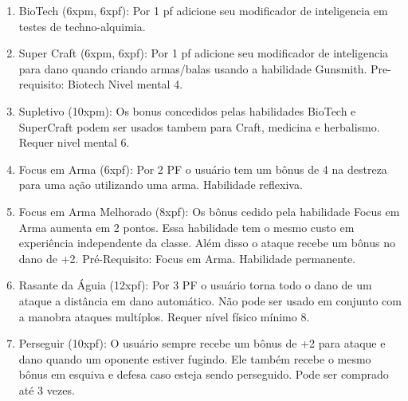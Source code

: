 \begin{enumerate}

	
	\item BioTech (6xpm, 6xpf): Por 1 pf adicione seu modificador de inteligencia em testes de techno-alquimia.

	\item Super Craft (6xpm, 6xpf): Por 1 pf adicione seu modificador de inteligencia para dano quando criando armas/balas usando a habilidade Gunsmith. Pre-requisito: Biotech Nivel mental 4.
	
	\item Supletivo (10xpm): Os bonus concedidos pelas habilidades BioTech e SuperCraft podem ser usados tambem para Craft, medicina e herbalismo. Requer nivel mental 6.
	
	\item Focus em Arma (6xpf): Por 2 PF o usuário tem um bônus de 4 na destreza para uma ação utilizando uma arma. Habilidade reflexiva.

	\item Focus em Arma Melhorado (8xpf): Os bônus cedido pela habilidade Focus em Arma aumenta em 2 pontos. Essa habilidade tem o mesmo custo em experiência independente da classe. Além disso o ataque recebe um bônus no dano de +2. Pré-Requisito: Focus em Arma. Habilidade permanente.


	\item Rasante da Águia (12xpf): Por 3 PF o usuário torna todo o dano de um ataque a distância em dano automático. Não pode ser usado em conjunto com a manobra ataques multíplos. Requer nível físico mínimo 8. 

	\item Perseguir (10xpf): O usuário sempre recebe um bônus de +2 para ataque e dano quando um oponente estiver fugindo. Ele também recebe o mesmo bônus em esquiva e defesa caso esteja sendo perseguido. Pode ser comprado até 3 vezes.



\end{enumerate}

